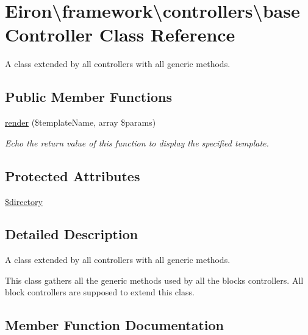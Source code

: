 \hypertarget{class_eiron_1_1framework_1_1controllers_1_1base_controller}{}\section{Eiron\textbackslash{}framework\textbackslash{}controllers\textbackslash{}base\+Controller Class Reference}
\label{class_eiron_1_1framework_1_1controllers_1_1base_controller}


A class extended by all controllers with all generic methods.  


\subsection*{Public Member Functions}
\begin{DoxyCompactItemize}
\item 
\hyperlink{class_eiron_1_1framework_1_1controllers_1_1base_controller_abe53d5e959cabb16f10b9d2501f88e7f}{render} (\$template\+Name, array \$params)
\begin{DoxyCompactList}\small\item\em Echo the return value of this function to display the specified template. \end{DoxyCompactList}\end{DoxyCompactItemize}
\subsection*{Protected Attributes}
\begin{DoxyCompactItemize}
\item 
\hyperlink{class_eiron_1_1framework_1_1controllers_1_1base_controller_abdc66dfbb3e33d44c8525e02013e327d}{\$directory}
\end{DoxyCompactItemize}


\subsection{Detailed Description}
A class extended by all controllers with all generic methods. 

This class gathers all the generic methods used by all the blocks controllers. All block controllers are supposed to extend this class. 

\subsection{Member Function Documentation}
